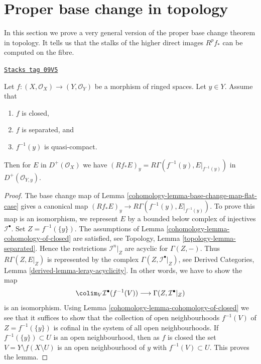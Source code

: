 \section{Proper base change in topology}
\label{cohomology-section-proper-base-change}
In this section we prove a very general version of the proper base change
theorem in topology. It tells us that the stalks of the higher direct
images $R^pf_*$ can be computed on the fibre.

\begin{lemma}
\label{cohomology-lemma-proper-base-change}
\href{https://stacks.math.columbia.edu/tag/09V5}{\texttt{Stacks tag 09V5}}

Let $f : (X, \mathcal{O}_X) \to (Y, \mathcal{O}_Y)$ be a morphism of
ringed spaces. Let $y \in Y$. Assume that
\begin{enumerate}
\item $f$ is closed,
\item $f$ is separated, and
\item $f^{-1}(y)$ is quasi-compact.
\end{enumerate}
Then for $E$ in $D^+(\mathcal{O}_X)$
we have $(Rf_*E)_y = R\Gamma(f^{-1}(y), E|_{f^{-1}(y)})$ in
$D^+(\mathcal{O}_{Y, y})$.
\end{lemma}

\begin{proof}

The base change map of Lemma \ref{cohomology-lemma-base-change-map-flat-case}
gives a canonical map $(Rf_*E)_y \to R\Gamma(f^{-1}(y), E|_{f^{-1}(y)})$.
To prove this map is an isomorphism, we represent $E$ by a bounded
below complex of injectives $\mathcal{I}^\bullet$.
Set $Z = f^{-1}(\{y\})$. The assumptions of
Lemma \ref{cohomology-lemma-cohomology-of-closed}
are satisfied, see Topology, Lemma \ref{topology-lemma-separated}.
Hence the restrictions
$\mathcal{I}^n|_Z$ are acyclic for $\Gamma(Z, -)$.
Thus $R\Gamma(Z, E|_Z)$ is represented by the
complex $\Gamma(Z, \mathcal{I}^\bullet|_Z)$, see
Derived Categories, Lemma \ref{derived-lemma-leray-acyclicity}.
In other words, we have to show the map
$$
\colim_V \mathcal{I}^\bullet(f^{-1}(V))
\longrightarrow
\Gamma(Z, \mathcal{I}^\bullet|_Z)
$$
is an isomorphism. Using Lemma \ref{cohomology-lemma-cohomology-of-closed}
we see that it suffices to show that the collection of open neighbourhoods
$f^{-1}(V)$ of $Z = f^{-1}(\{y\})$
is cofinal in the system of all open neighbourhoods.
If $f^{-1}(\{y\}) \subset U$ is an open neighbourhood, then as $f$ is closed
the set $V = Y \setminus f(X \setminus U)$ is an open neighbourhood
of $y$ with $f^{-1}(V) \subset U$. This proves the lemma.
\end{proof}

